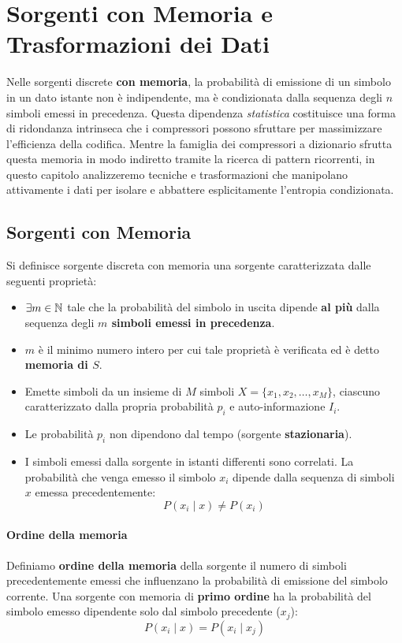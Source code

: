 \section{Sorgenti con Memoria e Trasformazioni dei Dati}
Nelle sorgenti discrete \textbf{con memoria}, la probabilità di emissione di un simbolo in un dato istante non è indipendente, ma è condizionata dalla sequenza degli $n$ simboli emessi in precedenza. Questa dipendenza \textit{statistica} costituisce una forma di ridondanza intrinseca che i compressori possono sfruttare per massimizzare l'efficienza della codifica. 
Mentre la famiglia dei compressori a dizionario sfrutta questa memoria in modo indiretto tramite la ricerca di pattern ricorrenti, in questo capitolo analizzeremo tecniche e trasformazioni che manipolano attivamente i dati per isolare e abbattere esplicitamente l'entropia condizionata.

\subsection{Sorgenti con Memoria}
Si definisce sorgente discreta con memoria una sorgente caratterizzata dalle seguenti proprietà:
\begin{itemize}
    \item $\exists\space m \in \mathbb{N}$ tale che la probabilità del simbolo in uscita dipende \textbf{al più} dalla sequenza degli \textbf{$m$ simboli emessi in precedenza}.
    \item $m$ è il minimo numero intero per cui tale proprietà è verificata ed è detto \textbf{memoria di $S$}.
    \item Emette simboli da un insieme di $M$ simboli $X=\{x_1, x_2,\dots, x_M\}$, ciascuno caratterizzato dalla propria probabilità $p_i$ e auto-informazione $I_i$.
    \item Le probabilità $p_i$ non dipendono dal tempo (sorgente \textbf{stazionaria}).
    \item I simboli emessi dalla sorgente in istanti differenti sono correlati. La probabilità che venga emesso il simbolo $x_i$ dipende dalla sequenza di simboli $x$ emessa precedentemente:
    \[P(x_i \mid x) \neq P(x_i)\]
\end{itemize}

\paragraph{Ordine della memoria}
Definiamo \textbf{ordine della memoria} della sorgente il numero di simboli precedentemente emessi che influenzano la probabilità di emissione del simbolo corrente.
Una sorgente con memoria di \textbf{primo ordine} ha la probabilità del simbolo emesso dipendente solo dal simbolo precedente ($x_j$):
\[P(x_i \mid x) = P(x_i \mid x_j)\]

